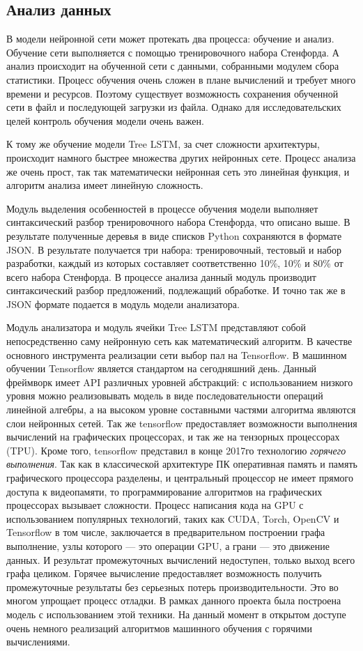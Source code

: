 \subsection{Анализ данных}\label{subsec:sys:data_analysis}
В модели нейронной сети может протекать два процесса: обучение и анализ. Обучение сети выполняется с помощью тренировочного набора Стенфорда. А анализ происходит на обученной сети с данными, собранными модулем сбора статистики. Процесс обучения очень сложен в плане вычислений и требует много времени и ресурсов. Поэтому существует возможность сохранения обученной сети в файл и последующей загрузки из файла. Однако для исследовательских целей контроль обучения модели очень важен.

К тому же обучение модели Tree LSTM, за счет сложности архитектуры, происходит намного быстрее множества других нейронных сете. Процесс анализа же очень прост, так так математически нейронная сеть это линейная функция, и алгоритм анализа имеет линейную сложность.

Модуль выделения особенностей в процессе обучения модели выполняет синтаксический разбор тренировочного набора Стенфорда, что описано выше. В результате полученные деревья в виде списков Python сохраняются в формате JSON\@. В результате получается три набора: тренировочный, тестовый и набор разработки, каждый из которых составляет соответственно 10\%, 10\% и 80\% от всего набора Стенфорда. В процессе анализа данный модуль производит синтаксический разбор предложений, подлежащий обработке. И точно так же в JSON формате подается в модуль модели анализатора.

Модуль анализатора и модуль ячейки Tree LSTM представляют собой непосредственно саму нейронную сеть как математический алгоритм. В качестве основного инструмента реализации сети выбор пал на Tensorflow. В машинном обучении Tensorflow является стандартом на сегодняшний день. Данный фреймворк имеет API различных уровней абстракций: с использованием низкого уровня можно реализовывать модель в виде последовательности операций линейной алгебры, а на высоком уровне составными частями алгоритма являются слои нейронных сетей. Так же tensorflow предоставляет возможности выполнения вычислений на графических процессорах, и так же на тензорных процессорах (TPU).
Кроме того, tensorflow представил в конце 2017го технологию \textit{горячего выполнения}. Так как в классической архитектуре ПК оперативная память и память графического процессора разделены, и центральный процессор не имеет прямого доступа к видеопамяти, то программирование алгоритмов на графических процессорах вызывает сложности. Процесс написания кода на GPU с использованием популярных технологий, таких как CUDA, Torch, OpenCV и Tensorflow в том числе, заключается в предварительном построении графа выполнение, узлы которого --- это операции GPU, а грани --- это движение данных. И результат промежуточных вычислений недоступен, только выход всего графа целиком. Горячее вычисление предоставляет возможность получить промежуточные результаты без серьезных потерь производительности. Это во многом упрощает процесс отладки. В рамках данного проекта была построена модель с использованием этой техники. На данный момент в открытом доступе очень немного реализаций алгоритмов машинного обучения с горячими вычислениями.

